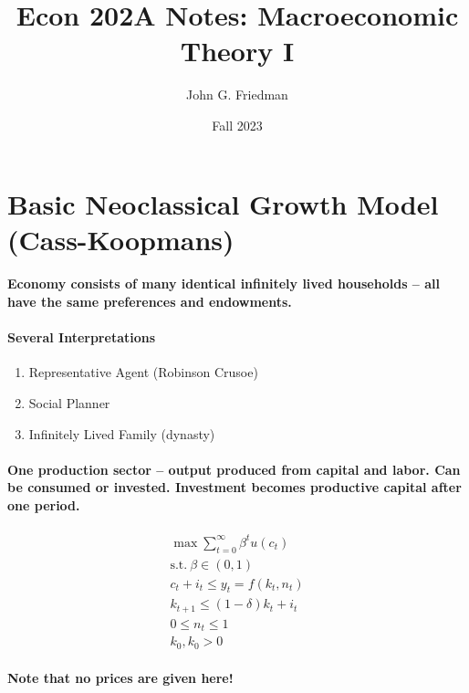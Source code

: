 \documentclass{article}
\begin{document}
\title{Econ 202A Notes: Macroeconomic Theory I}
\author{John G. Friedman}
\date{Fall 2023}
\maketitle

\section{Basic Neoclassical Growth Model (Cass-Koopmans)}
\paragraph{Economy consists of many identical infinitely 
lived households -- all have the same preferences and endowments.}

\paragraph{Several Interpretations}
\begin{enumerate}
    \item Representative Agent (Robinson Crusoe)
    \item Social Planner
    \item Infinitely Lived Family (dynasty)
\end{enumerate}

\paragraph{One production sector -- output produced from capital and labor. 
Can be consumed or invested. Investment becomes productive capital 
after one period.}

\[
    \begin{aligned}
        \max_{} \sum_{t=0}^\infty \beta^t u(c_t)\\
        \text{s.t.}\ \beta \in (0,1)\\
        c_t + i_t \leq y_t = f(k_t, n_t)\\
        k_{t+1} \leq (1 - \delta) k_t + i_t\\
        0 \leq n_t \leq 1\\
        k_0, k_0 > 0
    \end{aligned}
\]

\paragraph{Note that no prices are given here!}
\end{document}
